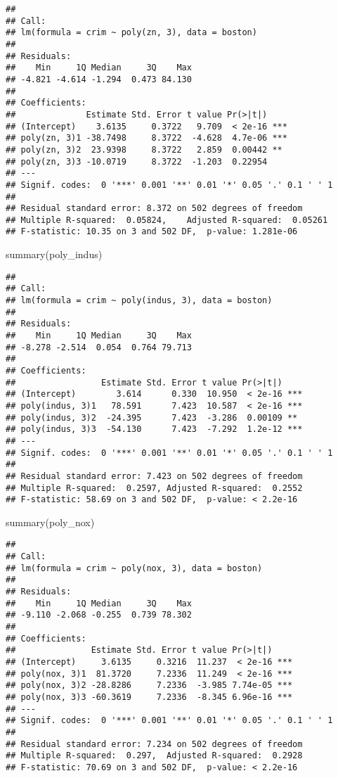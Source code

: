 \documentclass[
]{article}
\newenvironment{Shaded}{\begin{snugshade}}{\end{snugshade}}
\newcommand{\FunctionTok}[1]{\textcolor[rgb]{0.00,0.00,0.00}{#1}}
\newcommand{\NormalTok}[1]{#1}
\begin{document}
\begin{verbatim}
## 
## Call:
## lm(formula = crim ~ poly(zn, 3), data = boston)
## 
## Residuals:
##    Min     1Q Median     3Q    Max 
## -4.821 -4.614 -1.294  0.473 84.130 
## 
## Coefficients:
##              Estimate Std. Error t value Pr(>|t|)    
## (Intercept)    3.6135     0.3722   9.709  < 2e-16 ***
## poly(zn, 3)1 -38.7498     8.3722  -4.628  4.7e-06 ***
## poly(zn, 3)2  23.9398     8.3722   2.859  0.00442 ** 
## poly(zn, 3)3 -10.0719     8.3722  -1.203  0.22954    
## ---
## Signif. codes:  0 '***' 0.001 '**' 0.01 '*' 0.05 '.' 0.1 ' ' 1
## 
## Residual standard error: 8.372 on 502 degrees of freedom
## Multiple R-squared:  0.05824,    Adjusted R-squared:  0.05261 
## F-statistic: 10.35 on 3 and 502 DF,  p-value: 1.281e-06
\end{verbatim}

\begin{Shaded}
\begin{Highlighting}[]
\FunctionTok{summary}\NormalTok{(poly\_indus)}
\end{Highlighting}
\end{Shaded}

\begin{verbatim}
## 
## Call:
## lm(formula = crim ~ poly(indus, 3), data = boston)
## 
## Residuals:
##    Min     1Q Median     3Q    Max 
## -8.278 -2.514  0.054  0.764 79.713 
## 
## Coefficients:
##                 Estimate Std. Error t value Pr(>|t|)    
## (Intercept)        3.614      0.330  10.950  < 2e-16 ***
## poly(indus, 3)1   78.591      7.423  10.587  < 2e-16 ***
## poly(indus, 3)2  -24.395      7.423  -3.286  0.00109 ** 
## poly(indus, 3)3  -54.130      7.423  -7.292  1.2e-12 ***
## ---
## Signif. codes:  0 '***' 0.001 '**' 0.01 '*' 0.05 '.' 0.1 ' ' 1
## 
## Residual standard error: 7.423 on 502 degrees of freedom
## Multiple R-squared:  0.2597, Adjusted R-squared:  0.2552 
## F-statistic: 58.69 on 3 and 502 DF,  p-value: < 2.2e-16
\end{verbatim}

\begin{Shaded}
\begin{Highlighting}[]
\FunctionTok{summary}\NormalTok{(poly\_nox)}
\end{Highlighting}
\end{Shaded}

\begin{verbatim}
## 
## Call:
## lm(formula = crim ~ poly(nox, 3), data = boston)
## 
## Residuals:
##    Min     1Q Median     3Q    Max 
## -9.110 -2.068 -0.255  0.739 78.302 
## 
## Coefficients:
##               Estimate Std. Error t value Pr(>|t|)    
## (Intercept)     3.6135     0.3216  11.237  < 2e-16 ***
## poly(nox, 3)1  81.3720     7.2336  11.249  < 2e-16 ***
## poly(nox, 3)2 -28.8286     7.2336  -3.985 7.74e-05 ***
## poly(nox, 3)3 -60.3619     7.2336  -8.345 6.96e-16 ***
## ---
## Signif. codes:  0 '***' 0.001 '**' 0.01 '*' 0.05 '.' 0.1 ' ' 1
## 
## Residual standard error: 7.234 on 502 degrees of freedom
## Multiple R-squared:  0.297,  Adjusted R-squared:  0.2928 
## F-statistic: 70.69 on 3 and 502 DF,  p-value: < 2.2e-16
\end{verbatim}
\end{document}
